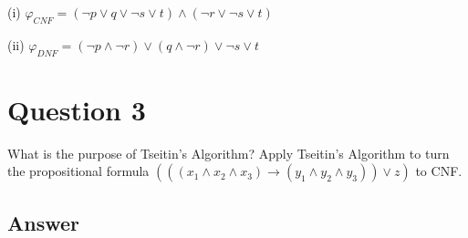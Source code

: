 \documentclass[12pt]{fphw}
\begin{document}
(i) $\varphi_{CNF} = (\neg p \vee q \vee \neg s \vee t) \wedge (\neg r \vee \neg s \vee t)$

(ii) $\varphi_{DNF} =(\neg p \wedge \neg r) \vee (q \wedge \neg r) \vee \neg s \vee t$

\newpage

\section*{Question 3}

\begin{problem}
  What is the purpose of Tseitin's Algorithm? Apply Tseitin's Algorithm to turn the propositional formula $(((x_1 \wedge x_2 \wedge x_3) \to (y_1 \wedge y_2 \wedge y_3)) \vee z)$ to CNF.
\end{problem}

\subsection*{Answer}
\end{document}

